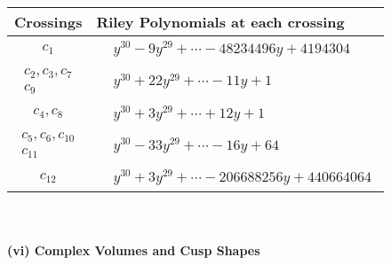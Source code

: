\documentclass[1p]{elsarticle_modified}
\theoremstyle{definition}
\begin{document}
\begin{tabular}{m{50pt}|m{274pt}}
Crossings & \hspace{64pt}Riley Polynomials at each crossing \\
\hline $$\begin{aligned}c_{1}\end{aligned}$$&$\begin{aligned}
&y^{30}-9 y^{29}+\cdots-48234496 y+4194304
\end{aligned}$\\
\hline $$\begin{aligned}c_{2},c_{3},c_{7}\\c_{9}\end{aligned}$$&$\begin{aligned}
&y^{30}+22 y^{29}+\cdots-11 y+1
\end{aligned}$\\
\hline $$\begin{aligned}c_{4},c_{8}\end{aligned}$$&$\begin{aligned}
&y^{30}+3 y^{29}+\cdots+12 y+1
\end{aligned}$\\
\hline $$\begin{aligned}c_{5},c_{6},c_{10}\\c_{11}\end{aligned}$$&$\begin{aligned}
&y^{30}-33 y^{29}+\cdots-16 y+64
\end{aligned}$\\
\hline $$\begin{aligned}c_{12}\end{aligned}$$&$\begin{aligned}
&y^{30}+3 y^{29}+\cdots-206688256 y+440664064
\end{aligned}$\\
\hline
\end{tabular}\\~\\
\newpage\flushleft \textbf{(vi) Complex Volumes and Cusp Shapes}
\end{document}
